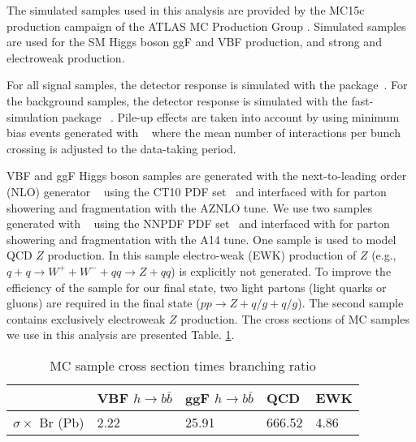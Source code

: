 
The simulated samples used in this analysis are provided by the MC15c
production campaign of the ATLAS MC Production
Group \cite{TWiki_AtlasProductionGroup}. 
Simulated samples are used for the SM Higgs boson
ggF and VBF production, and strong and electroweak \zjets{} production.

For all signal samples, the detector response is simulated with the \geantFour{}
package~\cite{Agostinelli:2002hh}.
For the \zjets{} background samples, the detector response is simulated 
with the fast-simulation
package \atlfastTwo{}~\cite{Richter-Was:683751}.
Pile-up effects are taken into account by using minimum bias events
generated with \pythia{}~\cite{Sjostrand:2014zea} where the mean number of interactions
per bunch crossing is adjusted to the data-taking period.

VBF and ggF Higgs boson samples are generated with the next-to-leading order (NLO)
generator \powheg{}~\cite{Nason:2004rx,Frixione:2007vw,Alioli:2010xd} using the
CT10 PDF set~\cite{Lai:2010vv} and interfaced with \pythia{} for parton showering
and fragmentation with the AZNLO tune.
We use two \zjets{} samples generated with \madgraph{}~\cite{Alwall:2014hca} 
using the NNPDF PDF set~\cite{nnpdf} and interfaced with \pythia{} for parton showering
and fragmentation with the A14 tune. One sample is used to model QCD $Z$ production.
In this sample electro-weak (EWK) production of $Z$
(e.g., $q+q \rightarrow W^{+} + W^{-} + qq  \rightarrow Z + qq$)
is explicitly not generated. To improve the efficiency of the sample
for our final state, two light partons (light quarks or gluons) are
required in the final state ($pp \rightarrow Z+ q/g + q/g$).
The second sample contains exclusively electroweak $Z$ production.
The cross sections of MC samples we use in this analysis are presented Table. \ref{tab:xsec}.

\begin{table}[htpb]
\centering
\caption{MC sample cross section times branching ratio}
\label{tab:xsec}
\begin{tabular}{|l|l|l|l|l|}
\hline
                   & VBF $h\rightarrow b \bar b$  & ggF $h\rightarrow b \bar b$  & QCD \zjets{} & EWK \zjets{} \\ \hline
$\sigma \times$ Br (Pb) & 2.22 & 25.91 & 666.52         & 4.86         \\ \hline
\end{tabular}
\end{table}

